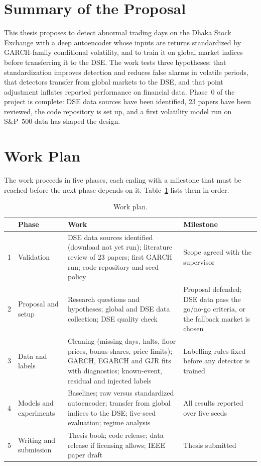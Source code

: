 
\section{Summary of the Proposal}
This thesis proposes to detect abnormal trading days on the Dhaka Stock Exchange with a
deep autoencoder whose inputs are returns standardized by GARCH-family conditional
volatility, and to train it on global market indices before transferring it to the DSE. The
work tests three hypotheses: that standardization improves detection and reduces false
alarms in volatile periods, that detectors transfer from global markets to the DSE, and that
point adjustment inflates reported performance on financial data. Phase~0 of the project is
complete: DSE data sources have been identified, 23 papers have been reviewed, the code
repository is set up, and a first volatility model run on S\&P~500 data has shaped the
design.

\section{Work Plan}
The work proceeds in five phases, each ending with a milestone that must be reached before
the next phase depends on it. Table~\ref{tab:plan} lists them in order.

\begin{table}[H]
\caption{Work plan.}
\label{tab:plan}
\begin{center}
\begin{tabular}{p{0.5cm} p{2.6cm} p{6.0cm} p{4.0cm}}
\hline
 & Phase & Work & Milestone \\
\hline
1 & Validation & DSE data sources identified (download not yet run); literature review
of 23 papers; first GARCH run; code repository and seed policy & Scope agreed with the
supervisor \\
2 & Proposal and setup & Research questions and hypotheses; global and DSE data collection;
DSE quality check & Proposal defended; DSE data pass the go/no-go criteria, or the
fallback market is chosen \\
3 & Data and labels & Cleaning (missing days, halts, floor prices, bonus shares, price
limits); GARCH, EGARCH and GJR fits with diagnostics; known-event, residual and injected
labels & Labelling rules fixed before any detector is trained \\
4 & Models and experiments & Baselines; raw versus standardized autoencoder; transfer
from global indices to the DSE; five-seed evaluation; regime analysis & All results
reported over five seeds \\
5 & Writing and submission & Thesis book; code release; data release if licensing allows;
IEEE paper draft & Thesis submitted \\
\hline
\end{tabular}
\end{center}
\end{table}

